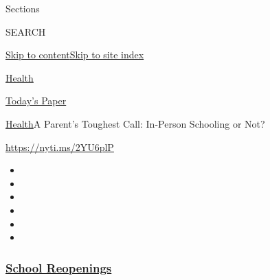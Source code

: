 Sections

SEARCH

\protect\hyperlink{site-content}{Skip to
content}\protect\hyperlink{site-index}{Skip to site index}

\href{https://www.nytimes3xbfgragh.onion/section/health}{Health}

\href{https://myaccount.nytimes3xbfgragh.onion/auth/login?response_type=cookie\&client_id=vi}{}

\href{https://www.nytimes3xbfgragh.onion/section/todayspaper}{Today's
Paper}

\href{/section/health}{Health}\textbar{}A Parent's Toughest Call:
In-Person Schooling or Not?

\url{https://nyti.ms/2YU6plP}

\begin{itemize}
\item
\item
\item
\item
\item
\item
\end{itemize}

\hypertarget{school-reopenings}{%
\subsubsection{\texorpdfstring{\href{https://www.nytimes3xbfgragh.onion/spotlight/schools-reopening?name=styln-coronavirus-schools-reopening\&region=TOP_BANNER\&block=storyline_menu_recirc\&action=click\&pgtype=Article\&impression_id=d5d64730-f1c6-11ea-8605-93fb3e12e0cf\&variant=undefined}{School
Reopenings}}{School Reopenings}}\label{school-reopenings}}

